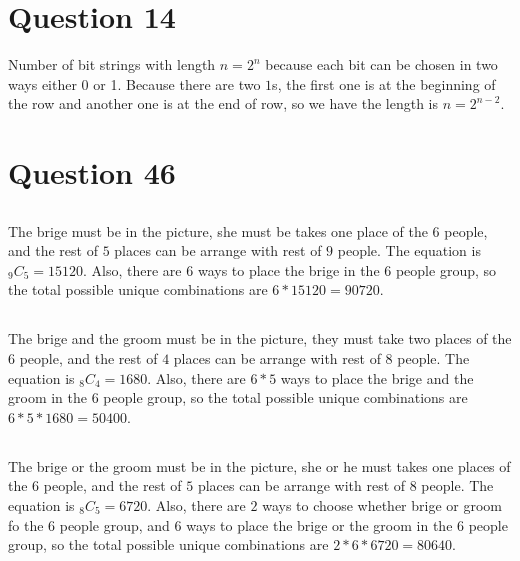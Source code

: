 \documentclass[11pt]{article}
\begin{document}
    \section{Question 14}
        Number of bit strings with length $n = 2^n$ because each bit can be chosen in two ways either 0 or 1. Because there are two $1$s, the first one is at the beginning of the row and another one is at the end of row, so we have the length is $n = 2^{n-2}$.

    \section{Question 46}
    \subsection{}
        The brige must be in the picture, she must be takes one place of the $6$ people, and the rest of $5$ places can be arrange with rest of $9$ people. The equation is $_9C_5 = 15120$. Also, there are $6$ ways to place the brige in the $6$ people group, so the total possible unique combinations are $6 * 15120 = 90720$.
    \subsection{}
        The brige and the groom must be in the picture, they must take two places of the $6$ people, and the rest of $4$ places can be arrange with rest of $8$ people. The equation is $_8C_4 = 1680$. Also, there are $6 * 5$ ways to place the brige and the groom in the $6$ people group, so the total possible unique combinations are $6 * 5 * 1680 = 50400$.
    \subsection{}
        The brige or the groom must be in the picture, she or he must takes one places of the $6$ people, and the rest of $5$ places can be arrange with rest of $8$ people. The equation is $_8C_5 = 6720$. Also, there are $2$ ways to choose whether brige or groom fo the $6$ people group, and $6$ ways to place the brige or the groom in the $6$ people group, so the total possible unique combinations are $2 * 6 * 6720 = 80640$.






 
\end{document}
